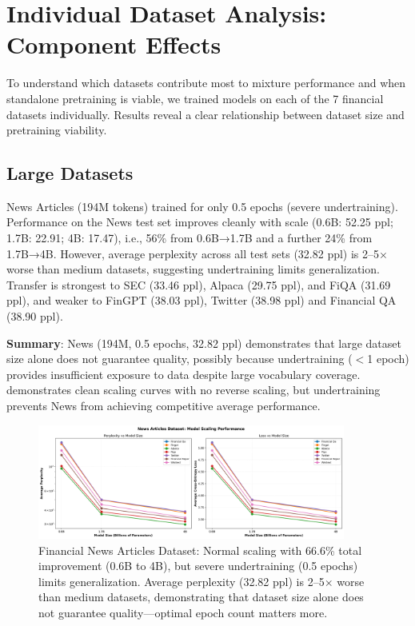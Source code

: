 \section{Individual Dataset Analysis: Component Effects}

To understand which datasets contribute most to mixture performance and when standalone pretraining is viable, we trained models on each of the 7 financial datasets individually. Results reveal a clear relationship between dataset size and pretraining viability.

\subsection{Large Datasets}

News Articles (194M tokens) trained for only 0.5 epochs (severe undertraining). Performance on the News test set improves cleanly with scale (0.6B: 52.25 ppl; 1.7B: 22.91; 4B: 17.47), i.e., 56\% from 0.6B→1.7B and a further 24\% from 1.7B→4B. However, average perplexity across all test sets (32.82 ppl) is 2–5$\times$ worse than medium datasets, suggesting undertraining limits generalization. Transfer is strongest to SEC (33.46 ppl), Alpaca (29.75 ppl), and FiQA (31.69 ppl), and weaker to FinGPT (38.03 ppl), Twitter (38.98 ppl) and Financial QA (38.90 ppl).

\textbf{Summary}: News (194M, 0.5 epochs, 32.82 ppl) demonstrates that large dataset size alone does not guarantee quality, possibly because undertraining ($<$1 epoch) provides insufficient exposure to data despite large vocabulary coverage.  demonstrates clean scaling curves with no reverse scaling, but undertraining prevents News from achieving competitive average performance.

\begin{figure}[htbp]
\centering
\includegraphics[width=0.9\textwidth]{figures/scaling_news_articles.png}
\caption[Financial News Dataset: Scaling Behavior]{Financial News Articles Dataset: Normal scaling with 66.6\% total improvement (0.6B to 4B), but severe undertraining (0.5 epochs) limits generalization. Average perplexity (32.82 ppl) is 2–5$\times$ worse than medium datasets, demonstrating that dataset size alone does not guarantee quality—optimal epoch count matters more.}
\label{fig:scaling_news_articles}
\end{figure}

